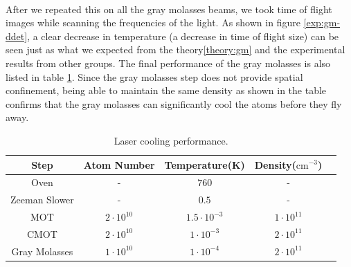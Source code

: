 \\
After we repeated this on all the gray molasses beams, we took time of flight images while scanning the frequencies of the light. As shown in figure \ref{exp:gm-ddet}, a clear decrease in temperature (a decrease in time of flight size) can be seen just as what we expected from the theory\ref{theory:gm} and the experimental results from other groups\cite{gm-theory}. The final performance of the gray molasses is also listed in table \ref{exp:laser-cooling}. Since the gray molasses step does not provide spatial confinement, being able to maintain the same density as shown in the table confirms that the gray molasses can significantly cool the atoms before they fly away.
\begin{table}
  \begin{center}
    \begin{tabular}{|c|c|c|c|c|}\hline
      Step&Atom Number&Temperature(K)&Density($\text{cm}^{-3}$)\\\hline
      Oven&-&$760$&-\\\hline
      Zeeman Slower&-&$0.5$&-\\\hline
      MOT&$2\cdot10^{10}$&$1.5\cdot10^{-3}$&$1\cdot10^{11}$\\\hline
      CMOT&$2\cdot10^{10}$&$1\cdot10^{-3}$&$2\cdot10^{11}$\\\hline
      Gray Molasses&$1\cdot10^{10}$&$1\cdot10^{-4}$&$2\cdot10^{11}$\\\hline
    \end{tabular}
  \end{center}
  \caption{Laser cooling performance.}
  \label{exp:laser-cooling}
\end{table}

